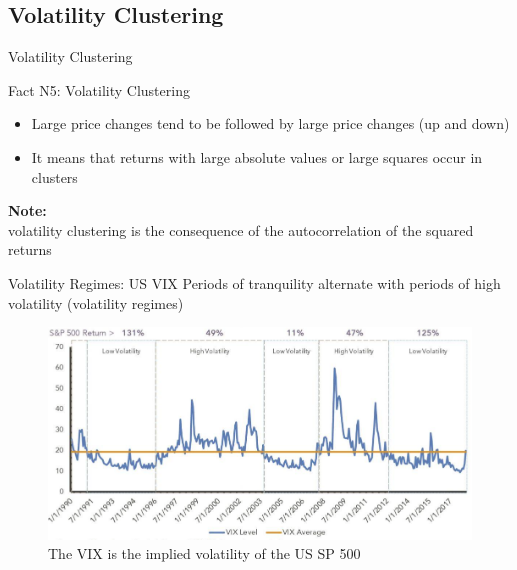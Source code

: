 \documentclass{beamer}
\begin{document}
\subsection{Volatility Clustering}
\begin{frame}{Volatility Clustering}
  \begin{exampleblock}{Fact N5: Volatility Clustering}
    \begin{itemize}
    \item Large price changes tend to be followed by large price changes (up and down)
    \item It means that returns with large absolute values or large squares occur in clusters    
    \end{itemize}    
  \end{exampleblock}
      \textbf{Note:}\\ volatility clustering is the consequence of the autocorrelation of the squared returns
\end{frame}


\begin{frame}{Volatility Regimes: US VIX}
  Periods of tranquility alternate with periods of high volatility (volatility regimes)\\

  \begin{figure}
      \centering
      \caption{The VIX is the implied volatility of the US SP 500}
      \includegraphics[width=.9\textwidth]{static/course_2_img/vix volatility.PNG}
  \end{figure}
\end{frame}




\end{document}
